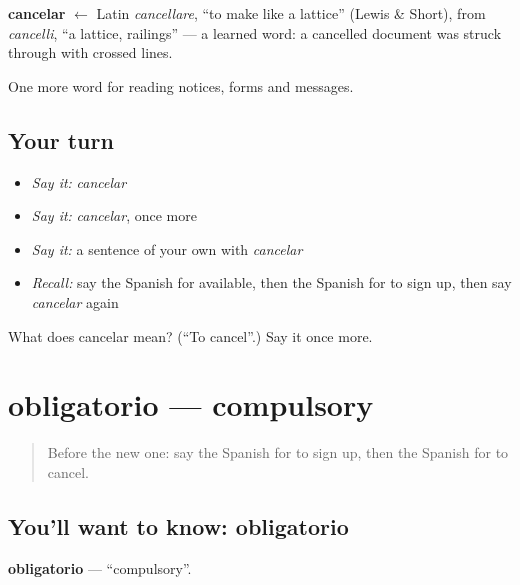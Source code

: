 \begin{cousinweb}
\textbf{cancelar} $\leftarrow$ Latin \emph{cancellare}, \textquotedblleft{}to make like a lattice\textquotedblright{} (Lewis \& Short), from \emph{cancelli}, \textquotedblleft{}a lattice, railings\textquotedblright{} — a learned word: a cancelled document was struck through with crossed lines.
\end{cousinweb}

\begin{grammarlens}[title={What you've built}]
One more word for reading notices, forms and messages.
\end{grammarlens}

\subsection*{Your turn}
\begin{itemize}
\raggedright
  \item \emph{Say it:} \emph{cancelar}
  \item \emph{Say it:} \emph{cancelar}, once more
  \item \emph{Say it:} a sentence of your own with \emph{cancelar}
  \item \emph{Recall:} say the Spanish for available, then the Spanish for to sign up, then say \emph{cancelar} again
\end{itemize}

\begin{tcolorbox}[breakable,colback=teal!4,colframe=teal!35!black,title={Before you move on}]
What does cancelar mean? (\textquotedblleft{}To cancel\textquotedblright{}.) Say it once more.
\end{tcolorbox}
\section[obligatorio]{obligatorio — compulsory}

\label{lesson:ES-C479-obligatorio}



\begin{quote}
Before the new one: say the Spanish for to sign up, then the Spanish for to cancel.
\end{quote}

\subsection*{You'll want to know: obligatorio}
\textbf{obligatorio} — \textquotedblleft{}compulsory\textquotedblright{}.

